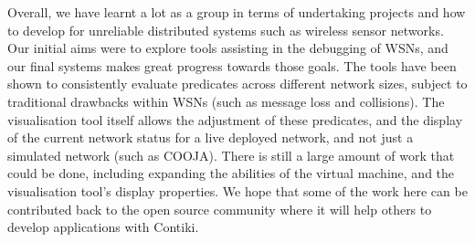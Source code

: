 Overall, we have learnt a lot as a group in terms of undertaking projects and how to develop for unreliable distributed systems such as wireless sensor networks. Our initial aims were to explore tools assisting in the debugging of WSNs, and our final systems makes great progress towards those goals. The tools have been shown to consistently evaluate predicates across different network sizes, subject to traditional drawbacks within WSNs (such as message loss and collisions). The visualisation tool itself allows the adjustment of these predicates, and the display of the current network status for a live deployed network, and not just a simulated network (such as COOJA). There is still a large amount of work that could be done, including expanding the abilities of the virtual machine, and the visualisation tool's display properties. We hope that some of the work here can be contributed back to the open source community where it will help others to develop applications with Contiki.

